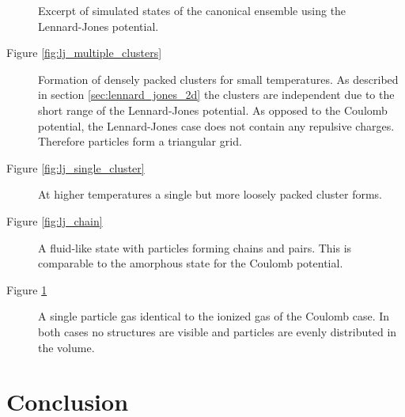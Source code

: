 \documentclass[11pt, a4paper]{article}
\numberwithin{equation}{section}
\begin{document}
\begin{figure}[h]
\begin{subfigure}[t]{0.48\textwidth}
		\label{fig:lj_gas}
		\vspace*{0.3cm}
	\end{subfigure}
	\caption{Excerpt of simulated states of the canonical ensemble using the Lennard-Jones potential.}
	\label{fig:lj_vis}
\end{figure}
\begin{description}
	\item[Figure \ref{fig:lj_multiple_clusters}] 
		Formation of densely packed clusters for small temperatures.
		As described in section \ref{sec:lennard_jones_2d} the clusters are independent due to the short range of the Lennard-Jones potential.
		As opposed to the Coulomb potential, the Lennard-Jones case does not contain any repulsive charges.
		Therefore particles form a triangular grid.
		
	\item[Figure \ref{fig:lj_single_cluster}]
		At higher temperatures a single but more loosely packed cluster forms.
	
	\item[Figure \ref{fig:lj_chain}]
		A fluid-like state with particles forming chains and pairs.
		This is comparable to the amorphous state for the Coulomb potential.
	
	\item[Figure \ref{fig:lj_gas}] 
		A single particle gas identical to the ionized gas of the Coulomb case.
		In both cases no structures are visible and particles are evenly distributed in the volume.
\end{description}

\clearpage
\section{Conclusion}
\end{document}
